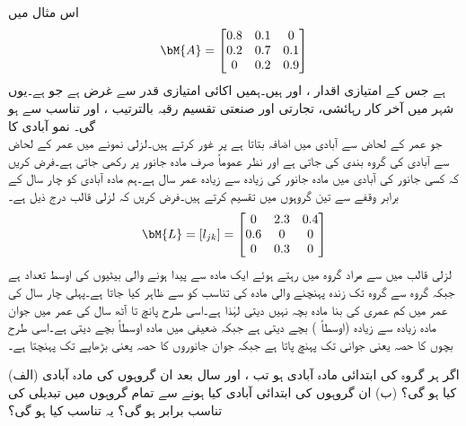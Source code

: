 اس مثال میں 
\begin{align*}
\bM{A}=\begin{bmatrix}
0.8&0.1&0\\0.2&0.7&0.1\\0&0.2&0.9
\end{bmatrix}
\end{align*}
ہے جس کے امتیازی اقدار ،  اور  ہیں۔ہمیں اکائی امتیازی قدر  سے غرض ہے جو  ہے۔یوں شہر میں آخر کار رہائشی، تجارتی اور صنعتی تقسیم رقبہ بالترتیب ،  اور  تناسب سے ہو گی۔
\quad نمو آبادی کا \\ 
 جو عمر کے لحاض سے آبادی میں اضافہ بتاتا ہے پر غور کرتے ہیں۔لزلی نمونے میں عمر کے لحاض سے آبادی کی گروہ بندی کی جاتی ہے اور نظر عموماً صرف مادہ جانور پر رکھی جاتی ہے۔فرض کریں کہ کسی جانور کی آبادی میں مادہ جانور کی زیادہ سے زیادہ عمر  سال ہے۔ہم مادہ آبادی کو چار سال کے برابر وقفے سے تین گروہوں میں تقسیم کرتے ہیں۔فرض کریں کہ لزلی قالب درج ذیل ہے۔
\begin{align*}
\bM{L}=[l_{jk}]=\begin{bmatrix} 0& 2.3&0.4\\0.6&0&0\\0&0.3&0 \end{bmatrix}
\end{align*}
لزلی قالب میں   سے مراد  گروہ میں رہتے ہوئے  ایک مادہ سے پیدا ہونے والی بیٹیوں کی اوسط تعداد ہے جبکہ گروہ  سے گروہ  تک زندہ پہنچنے والی مادہ کی تناسب کو  سے ظاہر کیا جاتا ہے۔پہلی چار سال کی عمر میں کم عمری کی بنا مادہ بچہ نہیں دیتی لہٰذا  ہے۔اسی طرح پانچ تا آٹھ سال کی عمر میں جوان مادہ زیادہ سے زیادہ (اوسطاً ) بچے  دیتی ہے جبکہ ضعیفی  میں مادہ  اوسطاً  بچے دیتی ہے۔اسی طرح بچوں کا  حصہ یعنی   جوانی تک پہنچ پاتا ہے جبکہ جوان جانوروں کا  حصہ یعنی  بڑھاپے تک پہنچتا ہے۔ 

 (الف) اگر ہر گروہ  کی ابتدائی مادہ  آبادی  ہو تب ،  اور  سال بعد ان گروہوں کی مادہ آبادی کیا ہو گی؟ (ب)  ان گروہوں کی ابتدائی آبادی کیا ہونے سے تمام گروہوں میں تبدیلی کی تناسب برابر ہو گی؟ یہ تناسب کیا ہو گی؟

